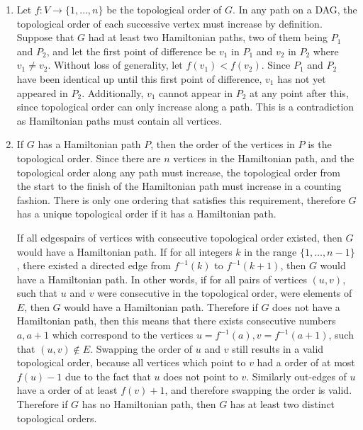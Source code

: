 \documentclass{article}
\begin{document}
\begin{solution}
\begin{enumerate}[label = (\alph*)]
    \item %
    Let $f:V\to \{1, \dots, n\}$ be the topological order of $G$. 
    In any path on a DAG, the topological order of each successive vertex must increase by definition.
    Suppose that $G$ had at least two Hamiltonian paths, two of them being $P_1$ and $P_2$, and let the first point of difference be $v_1$ in $P_1$ and $v_2$ in $P_2$ where $v_1\neq v_2$.
    Without loss of generality, let $f(v_1) < f(v_2)$. Since $P_1$ and $P_2$ have been identical up until this first point of difference, 
    $v_1$ has not yet appeared in $P_2$. Additionally, $v_1$ cannot appear in $P_2$ at any point after this, since topological order can only increase along a path. 
    This is a contradiction as Hamiltonian paths must contain all vertices.
    \item 
    If $G$ has a Hamiltonian path $P$, then the order of the vertices in $P$ is the topological order. 
    Since there are $n$ vertices in the Hamiltonian path, and the topological order along any path must increase, 
    the topological order from the start to the finish of the Hamiltonian path must increase in a counting fashion.
    There is only one ordering that satisfies this requirement, therefore $G$ has a unique topological order if it has a Hamiltonian path.

    If all edgespairs of vertices with consecutive topological order existed, then $G$ would have a Hamiltonian path.
    If for all integers $k$ in the range $\{1,\dots, n-1\}$, there existed a directed edge from $f^{-1}(k)$ to $f^{-1}(k + 1)$, then $G$ would have a Hamiltonian path.
    In other words, if for all pairs of vertices $(u,v)$, such that $u$ and $v$ were consecutive in the topological order, were elements of $E$, then $G$ would have a Hamiltonian path.
    Therefore if $G$ does not have a Hamiltonian path, then this means that there exists consecutive numbers $a, a + 1$ which correspond to the vertices
     $u=f^{-1}(a), v=f^{-1}(a+1)$, such that $(u, v)\notin E$.
    Swapping the order of $u$ and $v$ still results in a valid topological order, because all vertices which point to $v$ had a order of at most $f(u) - 1$ due to the fact
    that $u$ does not point to $v$. Similarly out-edges of $u$ have a order of at least $f(v) + 1$, and therefore swapping the order is valid.
    Therefore if $G$ has no Hamiltonian path, then $G$ has at least two distinct topological orders.


\end{enumerate}
\end{solution}
\end{document}
